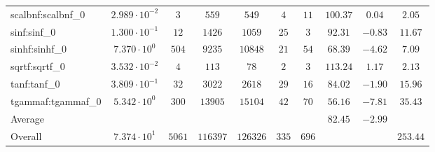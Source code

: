 \begin{tabular}{|l|c|c|c|c|c|c|c|c|c|}
scalbnf:scalbnf\_0       & $ 2.989 \cdot 10^{-2} $ & $ 3      $ & $ 559    $ & $ 549    $ & $ 4   $ & $ 11  $ & $ 100.37      $ & $ 0.04    $ & $ 2.05    $ \\
sinf:sinf\_0             & $ 1.300 \cdot 10^{-1} $ & $ 12     $ & $ 1426   $ & $ 1059   $ & $ 25  $ & $ 3   $ & $ 92.31       $ & $ -0.83   $ & $ 11.67   $ \\
sinhf:sinhf\_0           & $ 7.370 \cdot 10^{0}  $ & $ 504    $ & $ 9235   $ & $ 10848  $ & $ 21  $ & $ 54  $ & $ 68.39       $ & $ -4.62   $ & $ 7.09    $ \\
sqrtf:sqrtf\_0           & $ 3.532 \cdot 10^{-2} $ & $ 4      $ & $ 113    $ & $ 78     $ & $ 2   $ & $ 3   $ & $ 113.24      $ & $ 1.17    $ & $ 2.13    $ \\
tanf:tanf\_0             & $ 3.809 \cdot 10^{-1} $ & $ 32     $ & $ 3022   $ & $ 2618   $ & $ 29  $ & $ 16  $ & $ 84.02       $ & $ -1.90   $ & $ 15.96   $ \\
tgammaf:tgammaf\_0       & $ 5.342 \cdot 10^{0}  $ & $ 300    $ & $ 13905  $ & $ 15104  $ & $ 42  $ & $ 70  $ & $ 56.16       $ & $ -7.81   $ & $ 35.43   $ \\
\hline
Average                  & $                     $ & $        $ & $        $ & $        $ & $     $ & $     $ & $ 82.45       $ & $ -2.99   $ & $         $ \\
\hline
Overall                  & $ 7.374 \cdot 10^{1}  $ & $ 5061   $ & $ 116397 $ & $ 126326 $ & $ 335 $ & $ 696 $ & $             $ & $         $ & $ 253.44  $ \\
\hline
\end{tabular}
